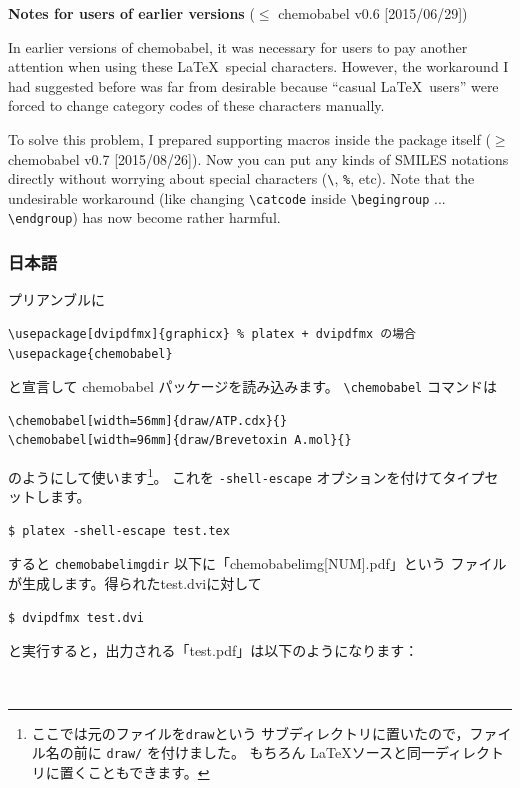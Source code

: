 \documentclass[12pt]{ltjsarticle}
\begin{document}
\noindent \textbf{Notes for users of earlier versions} ($\le$ \textsf{chemobabel} v0.6 [2015/06/29])

In earlier versions of \textsf{chemobabel}, it was necessary for users
to pay another attention when using these \LaTeX\ special characters.
However, the workaround I had suggested before was far from desirable
because ``casual \LaTeX\ users'' were forced to change category codes
of these characters manually.

To solve this problem, I prepared supporting macros inside the package
itself ($\ge$ \textsf{chemobabel} v0.7 [2015/08/26]).
Now you can put any kinds of SMILES notations directly without worrying
about special characters (\verb|\|, \verb|%|, etc).
Note that the undesirable workaround (like changing \verb|\catcode| inside
\verb|\begingroup| ... \verb|\endgroup|) has now become rather harmful.

\clearpage

\subsubsection{日本語}

プリアンブルに
\begin{verbatim}
\usepackage[dvipdfmx]{graphicx} % platex + dvipdfmx の場合
\usepackage{chemobabel}
\end{verbatim}
と宣言して \textsf{chemobabel} パッケージを読み込みます。
\verb|\chemobabel| コマンドは
\begin{verbatim}
\chemobabel[width=56mm]{draw/ATP.cdx}{}
\chemobabel[width=96mm]{draw/Brevetoxin A.mol}{}
\end{verbatim}
のようにして使います\footnote{ここでは元のファイルを\texttt{draw}という
サブディレクトリに置いたので，ファイル名の前に \texttt{draw/} を付けました。
もちろん \LaTeX ソースと同一ディレクトリに置くこともできます。}。
これを \verb|-shell-escape| オプションを付けてタイプセットします。
\begin{verbatim}
$ platex -shell-escape test.tex
\end{verbatim}
すると \verb|chemobabelimgdir| 以下に「chemobabelimg[NUM].pdf」という
ファイルが生成します。得られたtest.dviに対して
\begin{verbatim}
$ dvipdfmx test.dvi
\end{verbatim}
と実行すると，出力される「test.pdf」は以下のようになります：
\begin{figure}[h]
  \centering
   \\
\end{figure}
\end{document}
